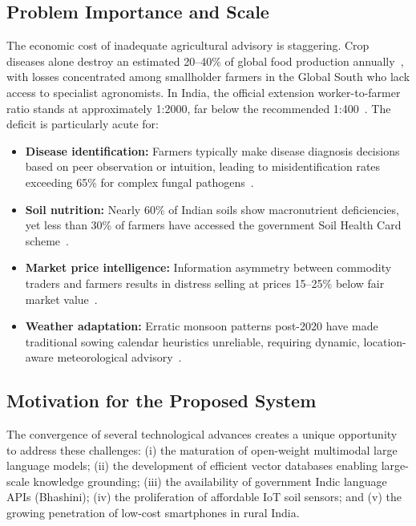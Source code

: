 \documentclass[12pt,a4paper]{article}
\begin{document}
\subsection{Problem Importance and Scale}

The economic cost of inadequate agricultural advisory is staggering. Crop diseases alone destroy an estimated 20--40\% of global food production annually~\cite{fao2022}, with losses concentrated among smallholder farmers in the Global South who lack access to specialist agronomists. In India, the official extension worker-to-farmer ratio stands at approximately 1:2000, far below the recommended 1:400~\cite{icar2023,nabard2023}. The deficit is particularly acute for:

\begin{itemize}
\item \textbf{Disease identification:} Farmers typically make disease diagnosis decisions based on peer observation or intuition, leading to misidentification rates exceeding 65\% for complex fungal pathogens~\cite{deeplearning2025}.
\item \textbf{Soil nutrition:} Nearly 60\% of Indian soils show macronutrient deficiencies, yet less than 30\% of farmers have accessed the government Soil Health Card scheme~\cite{icar2023}.
\item \textbf{Market price intelligence:} Information asymmetry between commodity traders and farmers results in distress selling at prices 15--25\% below fair market value~\cite{enam2023}.
\item \textbf{Weather adaptation:} Erratic monsoon patterns post-2020 have made traditional sowing calendar heuristics unreliable, requiring dynamic, location-aware meteorological advisory~\cite{fao2022}.
\end{itemize}

\subsection{Motivation for the Proposed System}

The convergence of several technological advances creates a unique opportunity to address these challenges: (i) the maturation of open-weight multimodal large language models; (ii) the development of efficient vector databases enabling large-scale knowledge grounding; (iii) the availability of government Indic language APIs (Bhashini); (iv) the proliferation of affordable IoT soil sensors; and (v) the growing penetration of low-cost smartphones in rural India.
\end{document}
